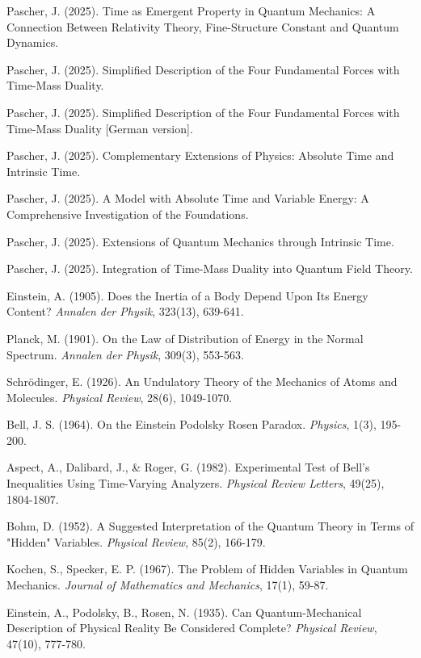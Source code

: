 \documentclass[12pt,a4paper]{article}  %
\begin{document}
	\begin{thebibliography}{99}
		 Pascher, J. (2025). Time as Emergent Property in Quantum Mechanics: A Connection Between Relativity Theory, Fine-Structure Constant and Quantum Dynamics.
		
		 Pascher, J. (2025). Simplified Description of the Four Fundamental Forces with Time-Mass Duality.
		
		 Pascher, J. (2025). Simplified Description of the Four Fundamental Forces with Time-Mass Duality [German version].
		
		 Pascher, J. (2025). Complementary Extensions of Physics: Absolute Time and Intrinsic Time.
		
		 Pascher, J. (2025). A Model with Absolute Time and Variable Energy: A Comprehensive Investigation of the Foundations.
		
		 Pascher, J. (2025). Extensions of Quantum Mechanics through Intrinsic Time.
		
		 Pascher, J. (2025). Integration of Time-Mass Duality into Quantum Field Theory.
		
		 Einstein, A. (1905). Does the Inertia of a Body Depend Upon Its Energy Content? \textit{Annalen der Physik}, 323(13), 639-641.
		
		 Planck, M. (1901). On the Law of Distribution of Energy in the Normal Spectrum. \textit{Annalen der Physik}, 309(3), 553-563.
		
		 Schrödinger, E. (1926). An Undulatory Theory of the Mechanics of Atoms and Molecules. \textit{Physical Review}, 28(6), 1049-1070.
		
		 Bell, J. S. (1964). On the Einstein Podolsky Rosen Paradox. \textit{Physics}, 1(3), 195-200.
		
		 Aspect, A., Dalibard, J., \& Roger, G. (1982). Experimental Test of Bell's Inequalities Using Time-Varying Analyzers. \textit{Physical Review Letters}, 49(25), 1804-1807.
		
		 Bohm, D. (1952). A Suggested Interpretation of the Quantum Theory in Terms of "Hidden" Variables. \textit{Physical Review}, 85(2), 166-179.
		
		 Kochen, S., Specker, E. P. (1967). The Problem of Hidden Variables in Quantum Mechanics. \textit{Journal of Mathematics and Mechanics}, 17(1), 59-87.
		
		 Einstein, A., Podolsky, B., Rosen, N. (1935). Can Quantum-Mechanical Description of Physical Reality Be Considered Complete? \textit{Physical Review}, 47(10), 777-780.
	\end{thebibliography}
	
\end{document}
